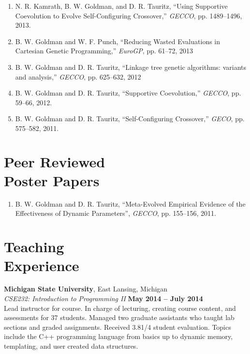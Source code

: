 \documentclass[margin,line]{resume}
\begin{document}
\begin{resume}
\begin{enumerate}
    \item
    N. R. Kamrath, B. W. Goldman, and D. R. Tauritz,
    ``Using Supportive Coevolution to Evolve Self-Configuring Crossover,''
    \textsl{GECCO}, pp. 1489--1496, 2013.

    \item
    B. W. Goldman and W. F. Punch,
    ``Reducing Wasted Evaluations in  Cartesian Genetic Programming,''
    \textsl{EuroGP}, pp. 61--72, 2013

    \item
    B. W. Goldman and D. R. Tauritz,
    ``Linkage tree genetic algorithms: variants and analysis,''
    \textsl{GECCO}, pp. 625--632, 2012

    \item
    B. W. Goldman and D. R. Tauritz,
    ``Supportive Coevolution,''
    \textsl{GECCO}, pp. 59--66, 2012.

    \item
    B. W. Goldman and D. R. Tauritz,
    ``Self-Configuring Crossover,''
    \textsl{GECO}, pp. 575--582, 2011.
    \end{enumerate}
    \section{\mysidestyle Peer Reviewed\\Poster Papers}
    \begin{enumerate}
    \item
    B. W. Goldman and D. R. Tauritz,
    ``Meta-Evolved Empirical Evidence of the Effectiveness of Dynamic Parameters'',
    \textsl{GECCO}, pp. 155--156, 2011.
    \end{enumerate}
    \pagebreak
    
    \section{\mysidestyle Teaching\\Experience}
    \textbf{Michigan State University}, East Lansing, Michigan \vspace{2mm}\\\vspace{1mm}%
    \textsl{CSE232: Introduction to Programming II} \hfill \textbf{May 2014 -- July 2014}\\
    Lead instructor for course. In charge of lecturing, creating course content, and assessments
    for 37 students. Managed two graduate assistants who taught lab sections and graded assignments.
    Received 3.81/4 student evaluation.
    Topics include the C++ programming language from basics up to dynamic memory, templating, and user created data structures.


\end{resume}
\end{document}
